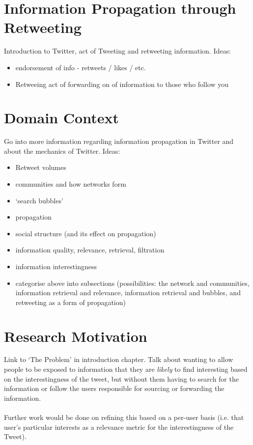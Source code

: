 \section{Information Propagation through Retweeting}

Introduction to Twitter, act of Tweeting and retweeting information. Ideas:
\begin{itemize}
\item endorsement of info - retweets / likes / etc.
\item Retweeing act of forwarding on of information to those who follow you
\end{itemize}

\section{Domain Context}
Go into more information regarding information propagation in Twitter and about the mechanics of Twitter. Ideas:
\begin{itemize}
\item Retweet volumes
\item communities and how networks form
\item `search bubbles'
\item propagation
\item social structure (and its effect on propagation)
\item information quality, relevance, retrieval, filtration
\item information interestingness
\item categorise above into subsections (possibilities: the network and communities, information retrieval and relevance, information retrieval and bubbles, and retweeting as a form of propagation)
\end{itemize}

\section{Research Motivation}
Link to `The Problem' in introduction chapter. Talk about wanting to allow people to be exposed to information that they are \textit{likely} to find interesting based on the interestingness of the tweet, but without them having to search for the information or follow the users responsible for sourcing or forwarding the information. \\ \\
Further work would be done on refining this based on a per-user basis (i.e. that user's particular interests as a relevance metric for the interestingness of the Tweet).